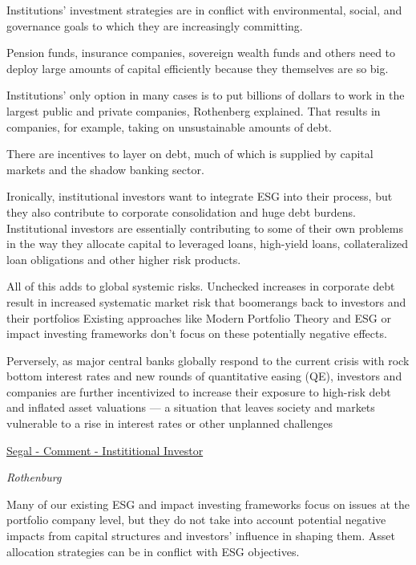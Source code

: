 \documentclass[
]{book}
\begin{document}
Institutions' investment strategies are in conflict with environmental, social, and governance goals to which they are increasingly committing.

Pension funds, insurance companies, sovereign wealth funds and others need to deploy large amounts of capital efficiently because they themselves are so big.

Institutions' only option in many cases is to put billions of dollars to work in the largest public and private companies, Rothenberg explained. That results in companies, for example, taking on unsustainable amounts of debt.

There are incentives to layer on debt, much of which is supplied by capital markets and the shadow banking sector.

Ironically, institutional investors want to integrate ESG into their process, but they also contribute to corporate consolidation and huge debt burdens. Institutional investors are essentially contributing to some of their own problems in the way they allocate capital to leveraged loans, high-yield loans, collateralized loan obligations
and other higher risk products.

All of this adds to global systemic risks.
Unchecked increases in corporate debt result in increased systematic market risk that boomerangs back to investors and their portfolios
Existing approaches like Modern Portfolio Theory and ESG or impact investing frameworks don't focus on these potentially negative effects.

Perversely, as major central banks globally respond to the current crisis with rock bottom interest rates and new rounds of quantitative easing (QE), investors and companies are further incentivized to increase their exposure to high-risk debt and inflated asset valuations --- a situation that leaves society and markets vulnerable to a rise in interest rates or other unplanned challenges

\href{https://www.institutionalinvestor.com/article/b1r9js87jhyn8s/How-Institutional-Investors-Encourage-Corporations-Bad-Behavior}{Segal - Comment - Instititional Investor}

\emph{Rothenburg}

Many of our existing ESG and impact investing frameworks focus on issues at the
portfolio company level, but they do not take into account potential negative
impacts from capital structures and investors' influence in shaping them.
Asset allocation strategies can be in conflict with ESG objectives.
\end{document}
